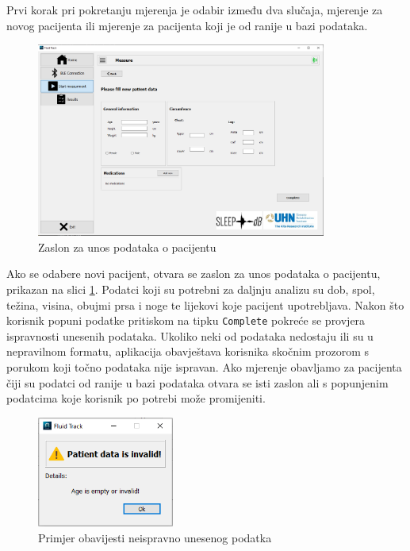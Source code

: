 \documentclass[../diplomski_rad.tex]{subfiles}
\begin{document}
Prvi korak pri pokretanju mjerenja je odabir između dva slučaja, mjerenje za novog pacijenta ili 
mjerenje za pacijenta koji je od ranije u bazi podataka.

\begin{figure}[htb]
    \centering
    \includegraphics[width=0.85\textwidth]{Figures/patient.png} 
    \caption{Zaslon za unos podataka o pacijentu}
    \label{slk:patient}
\end{figure}

Ako se odabere novi pacijent, otvara se zaslon za unos podataka o pacijentu, prikazan na slici \ref{slk:patient}. 
Podatci koji su potrebni za daljnju analizu su dob, spol, težina, visina, obujmi prsa i noge te lijekovi koje pacijent upotrebljava. 
Nakon što korisnik popuni podatke pritiskom na tipku \texttt{Complete} pokreće se provjera ispravnosti unesenih podataka. 
Ukoliko neki od podataka nedostaju ili su u nepravilnom formatu, aplikacija obavještava korisnika skočnim prozorom s 
porukom koji točno podataka nije ispravan. 
Ako mjerenje obavljamo za pacijenta čiji su podatci od ranije u bazi podataka otvara se isti zaslon ali s popunjenim podatcima 
koje korisnik po potrebi može promijeniti.  

\begin{figure}[htb]
    \centering
    \includegraphics[width=0.4\textwidth]{Figures/invalid_data.png} 
    \caption{Primjer obavijesti neispravno unesenog podatka}
    \label{slk:invalid_data}
\end{figure}
\end{document}
